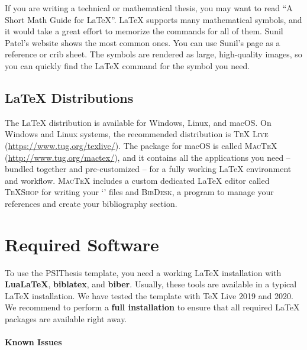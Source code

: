 If you are writing a technical or mathematical thesis, you may want to read \enquote{A Short Math Guide for LaTeX}.
LaTeX supports many mathematical symbols, and it would take a great effort to memorize the commands for all of them. Sunil Patel's website shows the most common ones.
You can use Sunil's page as a reference or crib sheet. The symbols are rendered as large, high-quality images, so you can quickly find the LaTeX command for the symbol you need.

\subsection{LaTeX Distributions}

The LaTeX distribution is available for Windows, Linux, and macOS\@.
On Windows and Linux systems, the recommended distribution is \textsc{TeX Live} (\url{https://www.tug.org/texlive/}).
The package for macOS is called \textsc{MacTeX} (\url{http://www.tug.org/mactex/}), and it contains all the applications you need -- bundled together and pre-customized -- for a fully working LaTeX environment and workflow.
\textsc{MacTeX} includes a custom dedicated LaTeX editor called \textsc{TeXShop} for writing your `' files and \textsc{BibDesk}, a program to manage your references and create your bibliography section.



\section{Required Software}
\label{sec:requirements}

To use the PSIThesis template, you need a working LaTeX installation with \textbf{LuaLaTeX}, \textbf{biblatex}, and \textbf{biber}.%
Usually, these tools are available in a typical LaTeX installation. We have tested the template with TeX Live 2019 and 2020. We recommend to perform a \textbf{full installation} to ensure that all required LaTeX packages are available right away.

\paragraph{Known Issues}

